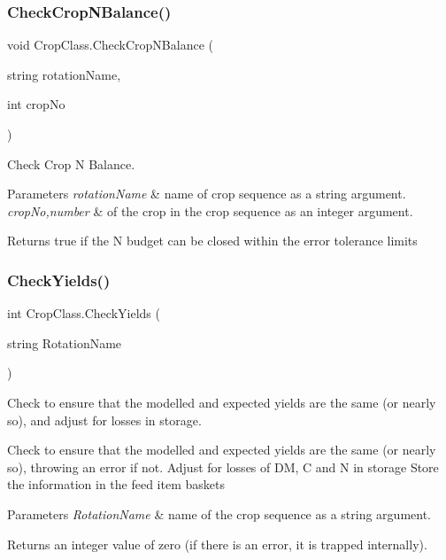 \subsubsection{\texorpdfstring{CheckCropNBalance()}{CheckCropNBalance()}}
{\footnotesize\ttfamily void Crop\+Class.\+Check\+Crop\+N\+Balance (\begin{DoxyParamCaption}\item[{string}]{rotation\+Name,  }\item[{int}]{crop\+No }\end{DoxyParamCaption})\hspace{0.3cm}{\ttfamily [inline]}}



Check Crop N Balance. 


\begin{DoxyParams}{Parameters}
{\em rotation\+Name} & name of crop sequence as a string argument. \\
\hline
{\em crop\+No,number} & of the crop in the crop sequence as an integer argument. \\
\hline
\end{DoxyParams}
\begin{DoxyReturn}{Returns}
true if the N budget can be closed within the error tolerance limits 
\end{DoxyReturn}
\mbox{\label{class_crop_class_aa028ed077f192692e18046792688e625}} 
\subsubsection{\texorpdfstring{CheckYields()}{CheckYields()}}
{\footnotesize\ttfamily int Crop\+Class.\+Check\+Yields (\begin{DoxyParamCaption}\item[{string}]{Rotation\+Name }\end{DoxyParamCaption})\hspace{0.3cm}{\ttfamily [inline]}}



Check to ensure that the modelled and expected yields are the same (or nearly so), and adjust for losses in storage. 

Check to ensure that the modelled and expected yields are the same (or nearly so), throwing an error if not. Adjust for losses of DM, C and N in storage Store the information in the feed item baskets 
\begin{DoxyParams}{Parameters}
{\em Rotation\+Name} & name of the crop sequence as a string argument. \\
\hline
\end{DoxyParams}
\begin{DoxyReturn}{Returns}
an integer value of zero (if there is an error, it is trapped internally). 
\end{DoxyReturn}
\mbox{\label{class_crop_class_ab2d8d3cbf83e1dacd6e57f02199b4e5d}} 
